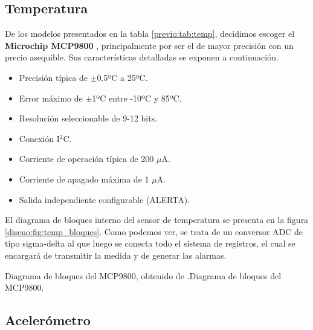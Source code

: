 \subsection{Temperatura}
\label{diseno:sec:temperatura}

De los modelos presentados en la tabla \ref{previo:tab:temp}, decidimos escoger el { \bf Microchip MCP9800} \cite{mcp9800}, principalmente por ser el de mayor precisión con un precio asequible. Sus características detalladas se exponen a continuación.

\begin{multicols}{2}
\begin{itemize}
\item Precisión típica de $\pm$0.5ºC a 25ºC.
\item Error máximo de $\pm$1ºC entre -10ºC y 85ºC.
\item Resolución seleccionable de 9-12 bits.
\item Conexión I$^2$C.
\item Corriente de operación típica de 200 $\mu$A.
\item Corriente de apagado máxima de 1 $\mu$A.
\item Salida independiente configurable (ALERTA).
\end{itemize}
\end{multicols}

El diagrama de bloques interno del sensor de temperatura se presenta en la figura \ref{diseno:fig:temp_bloques}. Como podemos ver, se trata de un conversor \ac{ADC} de tipo sigma-delta al que luego se conecta todo el sistema de registros, el cual se encargará de transmitir la medida y de generar las alarmas.

%
{Diagrama de bloques del MCP9800, obtenido de \cite{mcp9800}.}{Diagrama de bloques del MCP9800.}



\subsection{Acelerómetro}
\label{diseno:sec:acelerometro}

